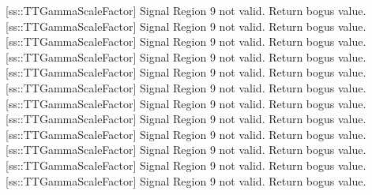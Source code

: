 [ss::TTGammaScaleFactor] Signal Region 9 not valid.  Return bogus value.
[ss::TTGammaScaleFactor] Signal Region 9 not valid.  Return bogus value.
[ss::TTGammaScaleFactor] Signal Region 9 not valid.  Return bogus value.
[ss::TTGammaScaleFactor] Signal Region 9 not valid.  Return bogus value.
[ss::TTGammaScaleFactor] Signal Region 9 not valid.  Return bogus value.
[ss::TTGammaScaleFactor] Signal Region 9 not valid.  Return bogus value.
[ss::TTGammaScaleFactor] Signal Region 9 not valid.  Return bogus value.
[ss::TTGammaScaleFactor] Signal Region 9 not valid.  Return bogus value.
[ss::TTGammaScaleFactor] Signal Region 9 not valid.  Return bogus value.
[ss::TTGammaScaleFactor] Signal Region 9 not valid.  Return bogus value.
[ss::TTGammaScaleFactor] Signal Region 9 not valid.  Return bogus value.
[ss::TTGammaScaleFactor] Signal Region 9 not valid.  Return bogus value.

